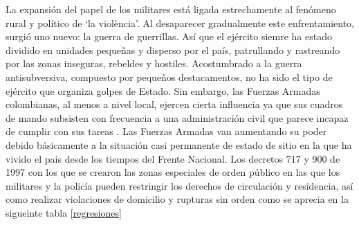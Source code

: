 \documentclass{article}
\begin{document}
La expansión del papel de los militares está ligada estrechamente al fenómeno rural y político de ‘la violència’. Al desaparecer gradualmente este enfrentamiento, surgió uno nuevo: la guerra de guerrillas. Así que el ejército siemre ha estado dividido en unidades pequeñas y disperso por el país, patrullando y rastreando por las zonas inseguras, rebeldes y hostiles. Acostumbrado a la guerra antisubversiva, compuesto por pequeños destacamentos, no ha sido el tipo de ejército que organiza golpes de Estado. Sin embargo, las Fuerzas Armadas colombianas, al menos a nivel local, ejercen cierta influencia ya que sus cuadros de mando subsisten con frecuencia a una administración civil que parece incapaz de cumplir con sus tareas \cite{lima_rational_2015}. Las Fuerzas Armadas van aumentando su poder debido básicamente a la situación casi permanente de estado de sitio en la que ha vivido el país desde los tiempos del Frente Nacional. Los decretos 717 y 900 de 1997 con los que se crearon las zonas especiales de orden público en las que los militares y la policía pueden restringir los derechos de circulación y residencia, así como realizar violaciones de domicilio y rupturas sin orden como se aprecia en la sigueinte tabla \ref{regresiones}
\end{document}
